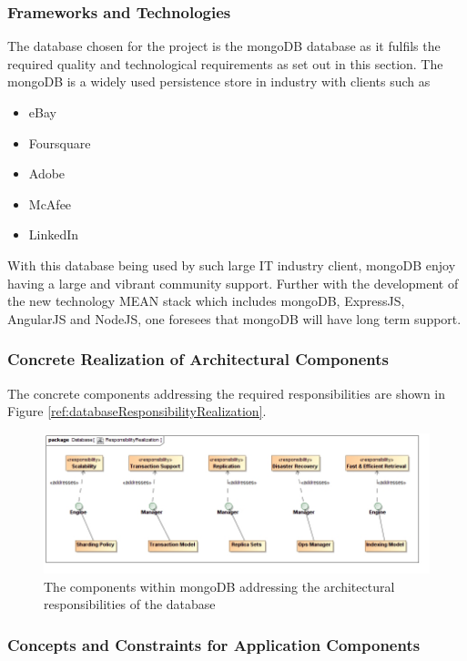\subsubsection{Frameworks and Technologies}
The database chosen for the project is the mongoDB database as it fulfils the
required quality and technological requirements as set out in this section. The
mongoDB is a widely used persistence store in industry with clients such as
\begin{itemize}
	\item eBay
	\item Foursquare
	\item Adobe
	\item McAfee
	\item LinkedIn
\end{itemize}

With this database being used by such large IT industry client, mongoDB enjoy having a large and vibrant community support. Further with the development of
the new technology MEAN stack which includes mongoDB, ExpressJS, AngularJS
and NodeJS, one foresees that mongoDB will have long term support.

\subsubsection{Concrete Realization of Architectural Components}
The concrete components addressing the required responsibilities are shown in Figure \ref{ref:databaseResponsibilityRealization}.
\begin{figure}[H]
	\begin{center}
	\includegraphics[scale=0.5]{../Diagrams and Charts/Database/ResponsibilityRealization.jpg}
	\caption{The components within mongoDB addressing the architectural responsibilities of the database}
	\label{fig:databaseResponsibilityRealization}
	\end{center}
\end{figure}

\subsubsection{Concepts and Constraints for Application Components}